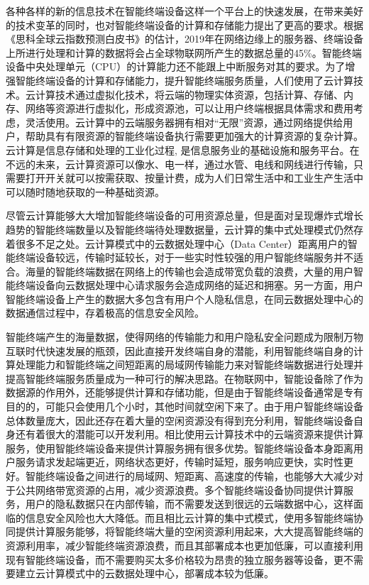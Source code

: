 各种各样的新的信息技术在智能终端设备这样一个平台上的快速发展，在带来美好的技术变革的同时，也对智能终端设备的计算和存储能力提出了更高的要求。根据《思科全球云指数预测白皮书》的估计，2019年在网络边缘上的服务器、终端设备上所进行处理和计算的数据将会占全球物联网所产生的数据总量的45\%\citep{Cisco2016}。智能终端设备中央处理单元（CPU）的计算能力还不能跟上中断服务对其的要求\cite{dinh2013survey,othman2014survey,wang2015survey}。为了增强智能终端设备的计算和存储能力，提升智能终端服务质量，人们使用了云计算技术。云计算技术通过虚拟化技术，将云端的物理实体资源，包括计算、存储、内存、网络等资源进行虚拟化，形成资源池，可以让用户终端根据具体需求和费用考虑，灵活使用。云计算中的云端服务器拥有相对“无限”资源，通过网络提供给用户，帮助具有有限资源的智能终端设备执行需要更加强大的计算资源的复杂计算\citep{Noor.2018}。云计算是信息存储和处理的工业化过程, 是信息服务业的基础设施和服务平台\citep{江绵恒2010}。在不远的未来，云计算资源可以像水、电一样，通过水管、电线和网线进行传输，只需要打开开关就可以按需获取、按量计费，成为人们日常生活中和工业生产生活中可以随时随地获取的一种基础资源\citep{buyya2009cloud}。

尽管云计算能够大大增加智能终端设备的可用资源总量，但是面对呈现爆炸式增长趋势的智能终端数量以及智能终端待处理数据量，云计算的集中式处理模式仍然存着很多不足之处。云计算模式中的云数据处理中心（Data Center）距离用户的智能终端设备较远，传输时延较长，对于一些实时性较强的用户智能终端服务并不适合。海量的智能终端数据在网络上的传输也会造成带宽负载的浪费，大量的用户智能终端设备向云数据处理中心请求服务会造成网络的延迟和拥塞\citep{Ismail2016Evaluation}。另一方面，用户智能终端设备上产生的数据大多包含有用户个人隐私信息，在同云数据处理中心的数据通信过程中，存着极高的信息安全风险。

智能终端产生的海量数据，使得网络的传输能力和用户隐私安全问题成为限制万物互联时代快速发展的瓶颈，因此直接开发终端自身的潜能\citep{王劲林2015一种现场}，利用智能终端自身的计算处理能力和智能终端之间短距离的局域网传输能力来对智能终端数据进行处理并提高智能终端服务质量成为一种可行的解决思路。在物联网中，智能设备除了作为数据源的作用外，还能够提供计算和存储功能，但是由于智能终端设备通常是专有目的的，可能只会使用几个小时，其他时间就空闲下来了\citep{renner2016towards}。由于用户智能终端设备总体数量庞大，因此还存在着大量的空闲资源没有得到充分利用，智能终端设备自身还有着很大的潜能可以开发利用。相比使用云计算技术中的云端资源来提供计算服务，使用智能终端设备来提供计算服务拥有很多优势。智能终端设备本身距离用户服务请求发起端更近，网络状态更好，传输时延短，服务响应更快，实时性更好。智能终端设备之间进行的局域网、短距离、高速度的传输，也能够大大减少对于公共网络带宽资源的占用，减少资源浪费。多个智能终端设备协同提供计算服务，用户的隐私数据只在内部传输，而不需要发送到很远的云端数据中心，这样面临的信息安全风险也大大降低。而且相比云计算的集中式模式，使用多智能终端协同提供计算服务能够，将智能终端大量的空闲资源利用起来，大大提高智能终端的资源利用率，减少智能终端资源浪费，而且其部署成本也更加低廉，可以直接利用现有智能终端设备，而不需要购买太多价格较为昂贵的独立服务器等设备，更不需要建立云计算模式中的云数据处理中心，部署成本较为低廉。

